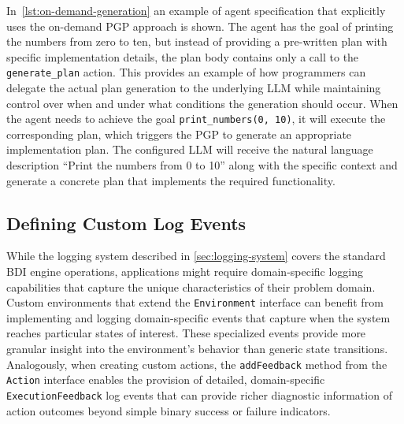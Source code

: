 \documentclass[12pt,a4paper,openright,twoside]{book}
\begin{document}
In~\cref{lst:on-demand-generation} an example of agent specification that explicitly uses the on-demand \ac{PGP} approach is shown. 
%
The agent has the goal of printing the numbers from zero to ten, but instead of providing a pre-written plan with specific implementation details, the plan body contains only a call to the \texttt{generate\_plan} action. 
%
This provides an example of how programmers can delegate the actual plan generation to the underlying \ac{LLM} while maintaining control over when and under what conditions the generation should occur.
%
When the agent needs to achieve the goal \texttt{print\_numbers(0, 10)}, it will execute the corresponding plan, which triggers the \ac{PGP} to generate an appropriate implementation plan. 
%
The configured \ac{LLM} will receive the natural language description ``Print the numbers from 0 to 10'' along with the specific context and generate a concrete plan that implements the required functionality. 



\subsection{Defining Custom Log Events}\label{sec:custom-log-events}

While the logging system described in \cref{sec:logging-system} covers the standard BDI engine operations, applications might require domain-specific logging capabilities that capture the unique characteristics of their problem domain.
%
Custom environments that extend the \texttt{Environment} interface can benefit from implementing and logging domain-specific events that capture when the system reaches particular states of interest. 
%
These specialized events provide more granular insight into the environment's behavior than generic state transitions.
%
Analogously, when creating custom actions, the \texttt{addFeedback} method from the \texttt{Action} interface enables the provision of detailed, domain-specific \texttt{ExecutionFeedback} log events that can provide richer diagnostic information of action outcomes beyond simple binary success or failure indicators.


\end{document}

